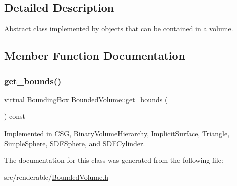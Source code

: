 \subsection{Detailed Description}
Abstract class implemented by objects that can be contained in a volume. 

\subsection{Member Function Documentation}
\mbox{\label{classBoundedVolume_a281168c4d827c38b46e639f6e4991a9e}} 
\subsubsection{\texorpdfstring{get\_bounds()}{get\_bounds()}}
{\footnotesize\ttfamily virtual \mbox{\hyperlink{classBoundingBox}{Bounding\+Box}} Bounded\+Volume\+::get\+\_\+bounds (\begin{DoxyParamCaption}{ }\end{DoxyParamCaption}) const\hspace{0.3cm}{\ttfamily [pure virtual]}}



Implemented in \mbox{\hyperlink{classCSG_abf2daf252f0b53f094ee5336eafb57ac}{C\+SG}}, \mbox{\hyperlink{classBinaryVolumeHierarchy_aaec23515bc9d81ccc9115489aed8808f}{Binary\+Volume\+Hierarchy}}, \mbox{\hyperlink{classImplicitSurface_a30f0b97eb9976f8e40be7b990d6352d6}{Implicit\+Surface}}, \mbox{\hyperlink{classTriangle_ac93216ac2308504ab7dd7679e6b84937}{Triangle}}, \mbox{\hyperlink{classSimpleSphere_aa5b6b2ebbe3de4490cdaa0f5c08b961c}{Simple\+Sphere}}, \mbox{\hyperlink{classSDFSphere_a9a0e4c9feb32bcd2ce78a3027d3ce2ad}{S\+D\+F\+Sphere}}, and \mbox{\hyperlink{classSDFCylinder_a45fafcbf4f71ed9b45d7ab09579c734c}{S\+D\+F\+Cylinder}}.



The documentation for this class was generated from the following file\+:\begin{DoxyCompactItemize}
\item 
src/renderable/\mbox{\hyperlink{BoundedVolume_8h}{Bounded\+Volume.\+h}}\end{DoxyCompactItemize}
